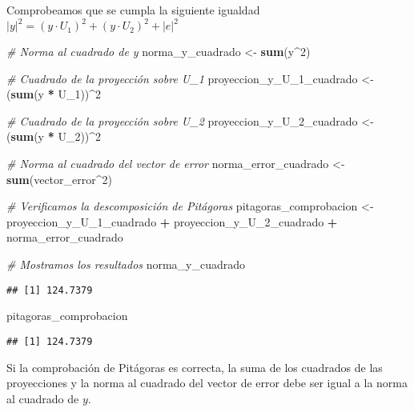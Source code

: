 \documentclass[
]{article}
\newenvironment{Shaded}{\begin{snugshade}}{\end{snugshade}}
\newcommand{\CommentTok}[1]{\textcolor[rgb]{0.56,0.35,0.01}{\textit{#1}}}
\newcommand{\DecValTok}[1]{\textcolor[rgb]{0.00,0.00,0.81}{#1}}
\newcommand{\FunctionTok}[1]{\textcolor[rgb]{0.13,0.29,0.53}{\textbf{#1}}}
\newcommand{\NormalTok}[1]{#1}
\newcommand{\OtherTok}[1]{\textcolor[rgb]{0.56,0.35,0.01}{#1}}
\newcommand{\SpecialCharTok}[1]{\textcolor[rgb]{0.81,0.36,0.00}{\textbf{#1}}}
\begin{document}
Comprobeamos que se cumpla la siguiente igualdad
\(|y|^2 = (y \cdot U_1)^2 + (y \cdot U_2)^2 + |e|^2\)

\begin{Shaded}
\begin{Highlighting}[]
\CommentTok{\# Norma al cuadrado de y}
\NormalTok{norma\_y\_cuadrado }\OtherTok{\textless{}{-}} \FunctionTok{sum}\NormalTok{(y}\SpecialCharTok{\^{}}\DecValTok{2}\NormalTok{)}

\CommentTok{\# Cuadrado de la proyección sobre U\_1}
\NormalTok{proyeccion\_y\_U\_1\_cuadrado }\OtherTok{\textless{}{-}}\NormalTok{ (}\FunctionTok{sum}\NormalTok{(y }\SpecialCharTok{*}\NormalTok{ U\_1))}\SpecialCharTok{\^{}}\DecValTok{2}

\CommentTok{\# Cuadrado de la proyección sobre U\_2}
\NormalTok{proyeccion\_y\_U\_2\_cuadrado }\OtherTok{\textless{}{-}}\NormalTok{ (}\FunctionTok{sum}\NormalTok{(y }\SpecialCharTok{*}\NormalTok{ U\_2))}\SpecialCharTok{\^{}}\DecValTok{2}

\CommentTok{\# Norma al cuadrado del vector de error}
\NormalTok{norma\_error\_cuadrado }\OtherTok{\textless{}{-}} \FunctionTok{sum}\NormalTok{(vector\_error}\SpecialCharTok{\^{}}\DecValTok{2}\NormalTok{)}

\CommentTok{\# Verificamos la descomposición de Pitágoras}
\NormalTok{pitagoras\_comprobacion }\OtherTok{\textless{}{-}}\NormalTok{ proyeccion\_y\_U\_1\_cuadrado }\SpecialCharTok{+}\NormalTok{ proyeccion\_y\_U\_2\_cuadrado }\SpecialCharTok{+}\NormalTok{ norma\_error\_cuadrado}

\CommentTok{\# Mostramos los resultados}
\NormalTok{norma\_y\_cuadrado}
\end{Highlighting}
\end{Shaded}

\begin{verbatim}
## [1] 124.7379
\end{verbatim}

\begin{Shaded}
\begin{Highlighting}[]
\NormalTok{pitagoras\_comprobacion}
\end{Highlighting}
\end{Shaded}

\begin{verbatim}
## [1] 124.7379
\end{verbatim}

Si la comprobación de Pitágoras es correcta, la suma de los cuadrados de
las proyecciones y la norma al cuadrado del vector de error debe ser
igual a la norma al cuadrado de \(y\).
\end{document}
